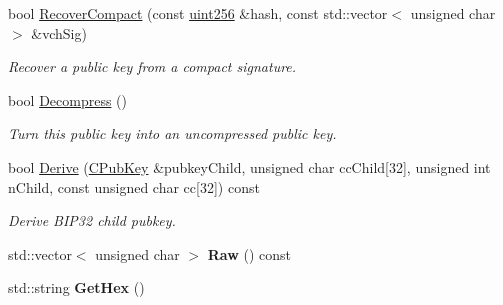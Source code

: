 \begin{DoxyCompactItemize}
\mbox{\label{class_c_pub_key_a169505e735a02db385486b0affeb565c}} 
bool \mbox{\hyperlink{class_c_pub_key_a169505e735a02db385486b0affeb565c}{Recover\+Compact}} (const \mbox{\hyperlink{classuint256}{uint256}} \&hash, const std\+::vector$<$ unsigned char $>$ \&vch\+Sig)
\begin{DoxyCompactList}\small\item\em Recover a public key from a compact signature. \end{DoxyCompactList}\item 
\mbox{\label{class_c_pub_key_a572689418fecf47b300a11519bc3da36}} 
bool \mbox{\hyperlink{class_c_pub_key_a572689418fecf47b300a11519bc3da36}{Decompress}} ()
\begin{DoxyCompactList}\small\item\em Turn this public key into an uncompressed public key. \end{DoxyCompactList}\item 
\mbox{\label{class_c_pub_key_a6e70269c1be731ace2fce8bfba9a0c36}} 
bool \mbox{\hyperlink{class_c_pub_key_a6e70269c1be731ace2fce8bfba9a0c36}{Derive}} (\mbox{\hyperlink{class_c_pub_key}{C\+Pub\+Key}} \&pubkey\+Child, unsigned char cc\+Child\mbox{[}32\mbox{]}, unsigned int n\+Child, const unsigned char cc\mbox{[}32\mbox{]}) const
\begin{DoxyCompactList}\small\item\em Derive B\+I\+P32 child pubkey. \end{DoxyCompactList}\item 
\mbox{\label{class_c_pub_key_a0901f7361c4e539dd6d35c79d0db3f89}} 
std\+::vector$<$ unsigned char $>$ {\bfseries Raw} () const
\item 
\mbox{\label{class_c_pub_key_a4d4192bf789f76e36dc15ddc75d8244c}} 
std\+::string {\bfseries Get\+Hex} ()
\end{DoxyCompactItemize}
